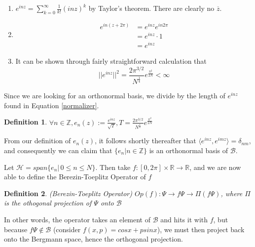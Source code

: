 \documentclass{article}
\newtheorem{mydef}{Definition}[section]
\begin{document}
\begin{enumerate}
\item 
$e^{inz} = \displaystyle\sum\limits_{k=0}^\infty \frac{1}{k!}(inz)^k$ by Taylor's theorem.  There are clearly no $\overline{z}$.

\item
\begin{equation*}
\begin{split}
e^{in(z+2\pi)} &= e^{inz} e^{in2\pi} \\
& = e^{inz}\cdot 1 \\
& = e^{inz}
\end{split}
\end{equation*}

\item 
It can be shown through fairly straightforward calculation that 
\begin{equation}
\lvert\lvert e^{inz}\rvert\rvert^2 = \frac{2\pi^{3/2}}{N^{\frac{1}{4}}}e^{\frac{\pi^2}{2N}} < \infty \label{normalizer}
\end{equation}
\end{enumerate} Since we are looking for an orthonormal basis, we divide by the length of $e^{inz}$ found in Equation \ref{normalizer}.

\begin{mydef}
$\forall n \in \mathbb{Z}, e_{n}(z) := \frac{e^{inz}}{\sqrt{T}}, T = \frac{2\pi^{3/2}}{N^{\frac{1}{4}}}e^{\frac{\pi^2}{2N}}$
\end{mydef} From our definition of $e_n(z)$, it follows shortly thereafter that  $\langle e^{inz},e^{imz}\rangle = \delta_{nm}$, and consequently we can claim that $\{e_n | n\in \mathbb{Z}\}$ is an orthonormal basis of $\mathcal{B}$.  

Let $\mathcal{H} = span\{e_n |\, 0\le n \le N\}$.  Then take $f: [0,2\pi]\times\mathbb{R} \rightarrow\mathbb{R}$, and we are now able to define the Berezin-Toeplitz Operator of $f$

\begin{mydef}
\emph{(Berezin-Toeplitz Operator)}
$Op(f):\Psi \rightarrow f\Psi\rightarrow\Pi(f\Psi)$, where $\Pi$ is the othogonal projection of $\Psi$  onto $\mathcal{B}$
\end{mydef}

In other words, the operator takes an element of $\mathcal{B}$ and hits it with $f$, but because $f\Psi\notin\mathcal{B}$ (consider $f(x,p) = cosx + psinx$), we must then project back onto the Bergmann space, hence the orthogonal projection.
\end{document}

